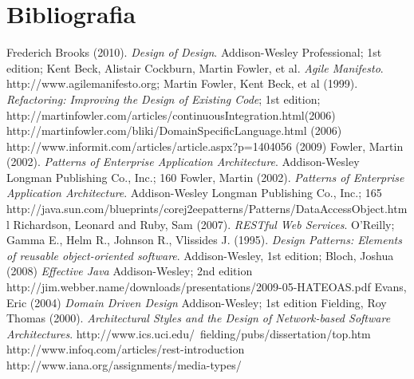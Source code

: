 \section{Bibliografia}

\begin{thebibliography}{12} 

 Frederich Brooks (2010). \textit{Design of Design}. Addison-Wesley Professional; 1st edition;
 Kent Beck, Alistair Cockburn, Martin Fowler, et al. \textit{Agile Manifesto}. http://www.agilemanifesto.org;
 Martin Fowler, Kent Beck, et al (1999). \textit{Refactoring: Improving the Design of Existing Code}; 1st edition;
 http://martinfowler.com/articles/continuousIntegration.html(2006)
 http://martinfowler.com/bliki/DomainSpecificLanguage.html (2006)
 http://www.informit.com/articles/article.aspx?p=1404056 (2009)
 Fowler, Martin (2002). \textit{Patterns of Enterprise Application Architecture}.  Addison-Wesley Longman Publishing Co., Inc.; 160
 Fowler, Martin (2002). \textit{Patterns of Enterprise Application Architecture}.  Addison-Wesley Longman Publishing Co., Inc.; 165
 http://java.sun.com/blueprints/corej2eepatterns/Patterns/DataAccessObject.html
 Richardson, Leonard and Ruby, Sam (2007). \textit{RESTful Web Services}. O'Reilly;
 Gamma E., Helm R., Johnson R., Vlissides J. (1995). \textit{Design Patterns: Elements of reusable object-oriented software}. Addison-Wesley, 1st edition;
 Bloch, Joshua (2008) \textit{Effective Java} Addison-Wesley; 2nd edition
 http://jim.webber.name/downloads/presentations/2009-05-HATEOAS.pdf
 Evans, Eric (2004) \textit{Domain Driven Design} Addison-Wesley; 1st edition 
 Fielding, Roy Thomas (2000). \textit{Architectural Styles and the Design of Network-based Software Architectures}. http://www.ics.uci.edu/~fielding/pubs/dissertation/top.htm
 http://www.infoq.com/articles/rest-introduction
 http://www.iana.org/assignments/media-types/


\end{thebibliography}
